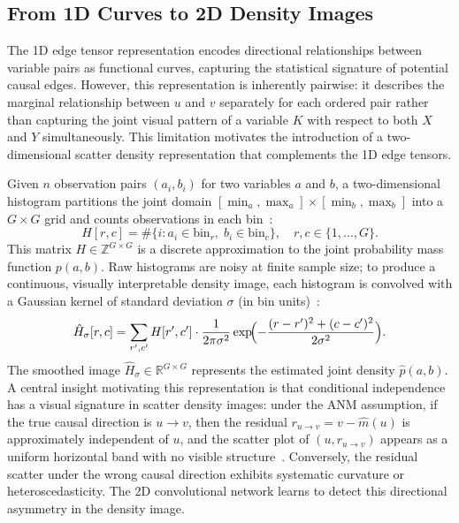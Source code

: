 \subsection{From 1D Curves to 2D Density Images}
\label{sec:1d_to_2d}

The 1D edge tensor representation encodes directional relationships between variable pairs as functional curves, capturing the statistical signature of potential causal edges. However, this representation is inherently pairwise: it describes the marginal relationship between $u$ and $v$ separately for each ordered pair rather than capturing the joint visual pattern of a variable $K$ with respect to both $X$ and $Y$ simultaneously. This limitation motivates the introduction of a two-dimensional scatter density representation that complements the 1D edge tensors.

Given $n$ observation pairs $(a_i,b_i)$ for two variables $a$ and $b$, a two-dimensional histogram partitions the joint domain $[\min_a,\max_a]\times[\min_b,\max_b]$ into a $G\times G$ grid and counts observations in each bin~\cite{scott1992multivariate}:
\begin{equation}
H[r,c]=\#\{i:a_i\in\mathrm{bin}_r,\;b_i\in\mathrm{bin}_c\},\quad r,c\in\{1,\ldots,G\}.
\label{eq:2d_hist}
\end{equation}
This matrix $H\in\mathbb{Z}^{G\times G}$ is a discrete approximation to the joint probability mass function $p(a,b)$. Raw histograms are noisy at finite sample size; to produce a continuous, visually interpretable density image, each histogram is convolved with a Gaussian kernel of standard deviation $\sigma$ (in bin units)~\cite{silverman1986density}:
\begin{equation}
\hat{H}_\sigma[r,c]=\sum_{r',c'}H[r',c']\cdot\frac{1}{2\pi\sigma^2}\exp\!\Bigl(-\frac{(r-r')^2+(c-c')^2}{2\sigma^2}\Bigr).
\label{eq:gauss_smooth}
\end{equation}
The smoothed image $\hat{H}_\sigma\in\mathbb{R}^{G\times G}$ represents the estimated joint density $\hat{p}(a,b)$. A central insight motivating this representation is that conditional independence has a visual signature in scatter density images: under the ANM assumption, if the true causal direction is $u\to v$, then the residual $r_{u\to v}=v-\hat{m}(u)$ is approximately independent of $u$, and the scatter plot of $(u,r_{u\to v})$ appears as a uniform horizontal band with no visible structure~\cite{hoyer2009anm}. Conversely, the residual scatter under the wrong causal direction exhibits systematic curvature or heteroscedasticity. The 2D convolutional network learns to detect this directional asymmetry in the density image.

